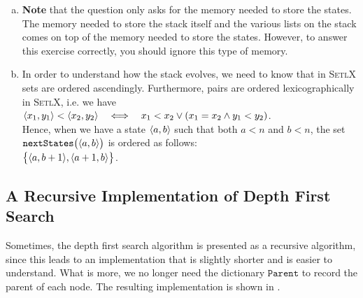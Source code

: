 \noindent
\begin{enumerate}[(a)]
\item \textbf{Note} that the question only asks for the memory needed to store the states.  The memory
      needed to store the stack itself and the various lists on the stack comes on top of the memory
      needed to store the states.  However,
      to answer this exercise correctly, you should ignore this type of memory.
\item In order to understand how the stack evolves, we need to know that in \textsc{SetlX} sets are ordered
      ascendingly.  Furthermore, pairs are ordered lexicographically in \textsc{SetlX}, i.e. we have
      \\[0.2cm]
      \hspace*{1.3cm}
      $\pair(x_1, y_1) < \pair(x_2, y_2) \quad\Longleftrightarrow\quad x_1 < x_2 \vee (x_1 = x_2 \wedge y_1 < y_2)$.
      \\[0.2cm]
      Hence, when we have a state $\pair(a, b)$ such that both $a<n$ and $b < n$, the
      set $\mathtt{nextStates}\bigl(\pair(a, b)\bigr)$ is ordered as follows:
      \\[0.2cm]
      \hspace*{1.3cm}
      $\bigl\{\pair(a,b+1), \pair(a+1,b) \bigr\}$. \eoxs
\end{enumerate}

\subsection{A Recursive Implementation of Depth First Search}
Sometimes, the depth first search algorithm is presented as a recursive algorithm, since this leads
to an implementation that is slightly shorter and is easier to understand.  What is more, we no
longer need the dictionary $\mathtt{Parent}$ to record the parent of each node.  The resulting
implementation is shown in .

